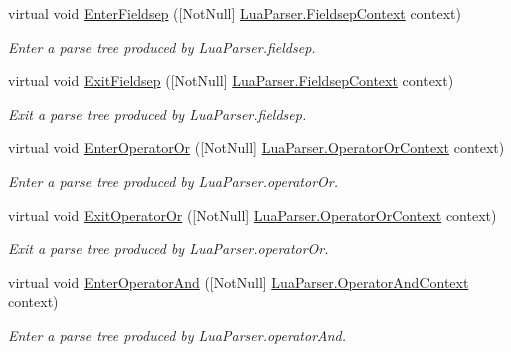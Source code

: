 \begin{DoxyCompactItemize}
virtual void \mbox{\hyperlink{classzlua_1_1_lua_base_listener_a2f94f0a470d5c71b06cb6daa8873e069}{Enter\+Fieldsep}} (\mbox{[}Not\+Null\mbox{]} \mbox{\hyperlink{classzlua_1_1_lua_parser_1_1_fieldsep_context}{Lua\+Parser.\+Fieldsep\+Context}} context)
\begin{DoxyCompactList}\small\item\em Enter a parse tree produced by Lua\+Parser.\+fieldsep. \end{DoxyCompactList}\item 
virtual void \mbox{\hyperlink{classzlua_1_1_lua_base_listener_aa7266127d89148ed4d6a559e5b59525e}{Exit\+Fieldsep}} (\mbox{[}Not\+Null\mbox{]} \mbox{\hyperlink{classzlua_1_1_lua_parser_1_1_fieldsep_context}{Lua\+Parser.\+Fieldsep\+Context}} context)
\begin{DoxyCompactList}\small\item\em Exit a parse tree produced by Lua\+Parser.\+fieldsep. \end{DoxyCompactList}\item 
virtual void \mbox{\hyperlink{classzlua_1_1_lua_base_listener_afc55e8820e1e62e135f4c2fd0d69825d}{Enter\+Operator\+Or}} (\mbox{[}Not\+Null\mbox{]} \mbox{\hyperlink{classzlua_1_1_lua_parser_1_1_operator_or_context}{Lua\+Parser.\+Operator\+Or\+Context}} context)
\begin{DoxyCompactList}\small\item\em Enter a parse tree produced by Lua\+Parser.\+operator\+Or. \end{DoxyCompactList}\item 
virtual void \mbox{\hyperlink{classzlua_1_1_lua_base_listener_ab2ff587916dcc9fe3b47ee7b560db090}{Exit\+Operator\+Or}} (\mbox{[}Not\+Null\mbox{]} \mbox{\hyperlink{classzlua_1_1_lua_parser_1_1_operator_or_context}{Lua\+Parser.\+Operator\+Or\+Context}} context)
\begin{DoxyCompactList}\small\item\em Exit a parse tree produced by Lua\+Parser.\+operator\+Or. \end{DoxyCompactList}\item 
virtual void \mbox{\hyperlink{classzlua_1_1_lua_base_listener_a78b389b5400066d8a9171b86b1529cf7}{Enter\+Operator\+And}} (\mbox{[}Not\+Null\mbox{]} \mbox{\hyperlink{classzlua_1_1_lua_parser_1_1_operator_and_context}{Lua\+Parser.\+Operator\+And\+Context}} context)
\begin{DoxyCompactList}\small\item\em Enter a parse tree produced by Lua\+Parser.\+operator\+And. \end{DoxyCompactList}\item 

\end{DoxyCompactItemize}
